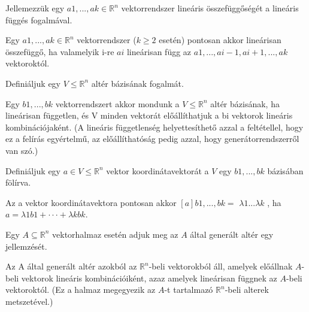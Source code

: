 \begin{frame}
  \begin{tcolorbox}[title={5}]
    Jellemezzük egy $a1,...,ak \in \mathbb{R}^n$ vektorrendszer lineáris összefüggőségét a lineáris függés fogalmával.


  \tcblower
Egy $a1,...,ak \in \mathbb{R}^n$ vektorrendszer ($k \geq 2$ esetén) pontosan akkor lineárisan összefüggő, ha valamelyik i-re $ai$ lineárisan függ az $a1,...,ai-1,ai+1,...,ak$ vektoroktól.
  \end{tcolorbox}
\end{frame}


\begin{frame}
  \begin{tcolorbox}[title={6}]
      Definiáljuk egy $V \leq \mathbb{R}^n$ altér bázisának fogalmát.


  \tcblower
Egy $b1,...,bk$ vektorrendszert akkor mondunk a $V \leq \mathbb{R}^n$ altér bázisának, ha lineárisan független, és V minden vektorát előállíthatjuk a bi vektorok lineáris kombinációjaként. (A lineáris függetlenség helyettesíthető azzal a feltétellel, hogy ez a felírás egyértelmű, az előállíthatóság pedig azzal, hogy generátorrendszerről van szó.)
  \end{tcolorbox}
\end{frame}


\begin{frame}
  \begin{tcolorbox}[title={7}]
      Definiáljuk egy $a \in V \leq \mathbb{R}^n$ vektor koordinátavektorát a $V$ egy $b1,...,bk$ bázisában fölírva.


  \tcblower
Az a vektor koordinátavektora pontosan akkor $[a]b1,...,bk =$
${\lambda}1 . . . {\lambda}k$
, ha $a = {\lambda}1b1+ \cdot  \cdot  \cdot +{\lambda}kbk$.
  \end{tcolorbox}
\end{frame}


\begin{frame}
  \begin{tcolorbox}[title={8}]
       Egy $A {\subseteq} \mathbb{R}^n$ vektorhalmaz esetén adjuk meg az $A$ által generált altér egy jellemzését.


  \tcblower
Az A által generált altér azokból az $\mathbb{R}^n$-beli vektorokból áll, amelyek előállnak $A$-beli vektorok lineáris kombinációiként, azaz amelyek lineárisan függnek az $A$-beli vektoroktól. (Ez a halmaz megegyezik az $A$-t tartalmazó $\mathbb{R}^n$-beli alterek metszetével.)

  \end{tcolorbox}
\end{frame}



